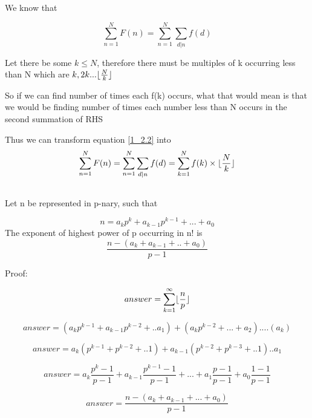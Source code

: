 \documentclass{article}
\DeclarePairedDelimiter{\floor}{\lfloor}{\rfloor}
\begin{document}
We know that

\begin{equation}\label{1_2.2}
    \sum_{n=1}^{N} F(n) = \sum_{n=1}^{N} \sum_{d\vert n} f(d)
\end{equation}


Let there be some \(k \leq N\), therefore there must be multiples of k occurring \indent less than N which are \(k, 2k . . . \floor{\frac{N}{k}}\)

So if we can find number of times each f(k) occurs, what that would mean \indent is that we would be finding number of times each number less than N occurs \indent in the second summation of RHS

Thus we can transform equation \ref{1_2.2} into 
\[
    \sum_{n=1}^{N} F(n) = \sum_{n=1}^{N} \sum_{d\vert n} f(d) = \sum_{k=1}^{N} f(k) \times \floor{\frac{N}{k}}
\]

\subsection{}
Let n be represented in p-nary, such that

\[
    n = a_{k}p^{k} + a_{k-1}p^{k-1} + . . . + a_{0}
\]
The exponent of highest power of p occurring in n! is
\[
    \frac{n - (a_k + a_{k-1} + . . + a_0)}{p-1}
\]

Proof:

\[
    answer = \sum_{k=1}^{\infty} \floor{\frac{n}{p}}
\]

\[
    answer = ( a_{k}p^{k-1} + a_{k-1}p^{k-2} + . . a_1 ) + ( a_{k}p^{k-2} + . . . + a_2 ) . . . . ( a_{k} ) 
\]

\[
    answer = a_{k} ( p^{k-1} + p^{k-2} + . . 1 ) + a_{k-1} ( p^{k-2} + p^{k-3} + . . 1 ) . . a_{1}
\]

\[
    answer = a_{k} \frac{p^{k} - 1}{p - 1} + a_{k-1} \frac{p^{k-1} - 1}{p - 1} + . . .  + a_1 \frac{p-1}{p-1} + a_0\frac{1 - 1}{p - 1}
\]

\[
    answer = \frac{n - (a_k + a_{k-1} + .  . . + a_0 )}{p-1}
\]
\end{document}
